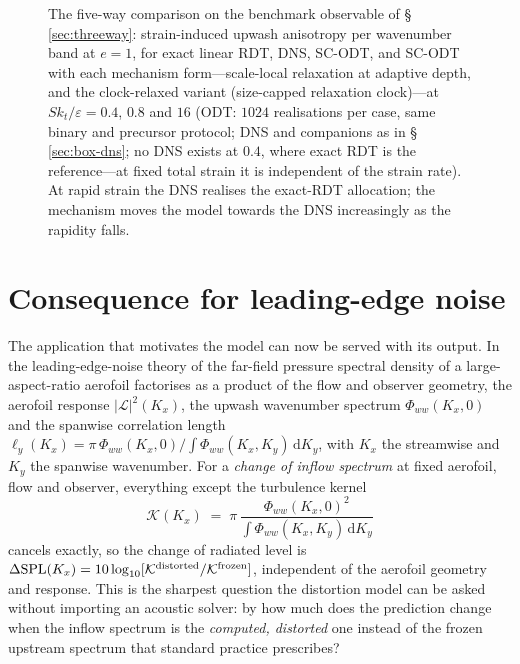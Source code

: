 \documentclass[11pt,a4paper]{article}
\begin{document}
\begin{figure}
  \centering
  \caption{The five-way comparison on the benchmark observable of
  \S\,\ref{sec:threeway}: strain-induced upwash anisotropy per
  wavenumber band at $e=1$, for exact linear RDT, DNS, SC-ODT, and
  SC-ODT with each mechanism form---scale-local relaxation at adaptive
  depth, and the clock-relaxed variant (size-capped relaxation clock)---at
  $Sk_t/\varepsilon=0.4$, $0.8$ and $16$ (ODT: $1024$ realisations per
  case, same binary and precursor protocol; DNS and companions as in
  \S\,\ref{sec:box-dns}; no DNS exists at $0.4$, where exact RDT is
  the reference---at fixed total strain it is independent of the
  strain rate). At rapid strain the DNS realises the exact-RDT
  allocation; the mechanism moves the model towards the DNS
  increasingly as the rapidity falls.}
  \label{fig:fourway}
\end{figure}

\section{Consequence for leading-edge noise}\label{sec:lenoise}

The application that motivates the model can now be served with its
output. In the leading-edge-noise theory of \citet{Amiet1975} the
far-field pressure spectral density of a large-aspect-ratio aerofoil
factorises as a product of the flow and observer geometry, the aerofoil
response $|\mathcal L|^2(K_x)$, the upwash wavenumber spectrum
$\Phi_{ww}(K_x,0)$ and the spanwise correlation length
$\ell_y(K_x)=\pi\,\Phi_{ww}(K_x,0)/\!\int\Phi_{ww}(K_x,K_y)\,
\mathrm{d}K_y$, with $K_x$ the streamwise and $K_y$ the spanwise
wavenumber. For a \emph{change of inflow spectrum} at fixed aerofoil,
flow and observer, everything except the turbulence kernel
\begin{equation}
  \mathcal K(K_x)
  \;=\;
  \pi\,\frac{\Phi_{ww}(K_x,0)^2}{\int\Phi_{ww}(K_x,K_y)\,\mathrm{d}K_y}
  \label{eq:knoise}
\end{equation}
cancels exactly, so the change of radiated level is
$\Delta\mathrm{SPL}(K_x)=10\log_{10}
[\mathcal K^{\rm distorted}/\mathcal K^{\rm frozen}]$, independent of
the aerofoil geometry and response. This is the sharpest question the
distortion model can be asked without importing an acoustic solver:
by how much does the prediction change when the inflow spectrum is the
\emph{computed, distorted} one instead of the frozen upstream spectrum
that standard practice prescribes?
\end{document}
